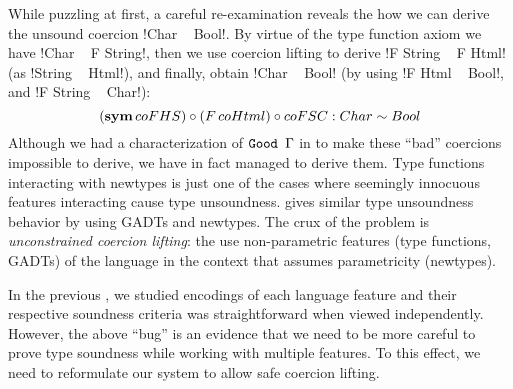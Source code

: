 \documentclass[screen,nonacm,manuscript,review]{acmart} %
\begin{document}
While puzzling at first, a careful re-examination reveals the
how we can derive the unsound coercion !Char ~ Bool!.
By virtue of the type function axiom we have !Char ~ F String!,
then we use coercion lifting to derive !F String ~ F Html!
(as !String ~ Html!), and finally, obtain !Char ~ Bool!
(by using !F Html ~ Bool!, and !F String ~ Char!):
\[
{{(\textbf{sym}\,{c}oFHS)} \circ {(F\,coHtml)}} \circ {coFSC} : Char \sim Bool
\]
Although we had a characterization of $\texttt{Good~}\Gamma$ in
 to make these ``bad'' coercions
impossible to derive, we have in fact managed to derive them.
Type functions interacting with newtypes is just one of the cases where
seemingly innocuous features interacting cause type unsoundness.
\citet{weirich_generative_2011} gives similar type unsoundness behavior
by using GADTs and newtypes. The crux of the problem is
\emph{unconstrained coercion lifting}: the use non-parametric
features (type functions, GADTs) of the language in the context that assumes
parametricity (newtypes).

In the previous , we studied \SFC
encodings of each language feature and their respective soundness
criteria was straightforward when viewed independently.
However, the above ``bug'' is an evidence that we need to be more
careful to prove type soundness while working with multiple features.
To this effect, we need to reformulate our system to allow safe coercion lifting.
\end{document}
